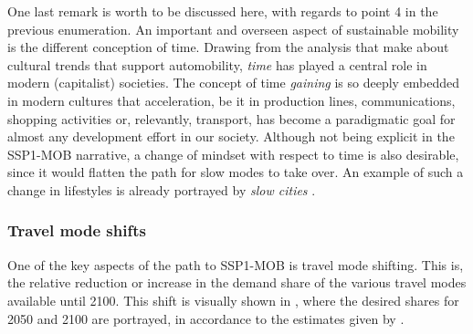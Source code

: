 One last remark is worth to be discussed here, with regards to point 4 in the previous enumeration. An important and overseen aspect of sustainable mobility is the different conception of time. Drawing from the analysis that \textcite{zijlstra2012_SocioSpatialPerspective} make about cultural trends that support automobility, \emph{time} has played a central role in modern (capitalist) societies. The concept of time \emph{gaining} is so deeply embedded in modern cultures that acceleration, be it in production lines, communications, shopping activities or, relevantly, transport, has become a paradigmatic goal for almost any development effort in our society. Although not being explicit in the SSP1-MOB narrative, a change of mindset with respect to time is also desirable, since it would flatten the path for slow modes to take over. An example of such a change in lifestyles is already portrayed by \emph{slow cities} \parencite{mayer2006_SlowCitiesSustainable}.

\subsubsection*{Travel mode shifts}
One of the key aspects of the path to SSP1-MOB is travel mode shifting. This is, the relative reduction or increase in the demand share of the various travel modes available until 2100. This shift is visually shown in , where the desired shares for 2050 and 2100 are portrayed, in accordance to the estimates given by \textcite{vuuren2017_Energylanduse}.

